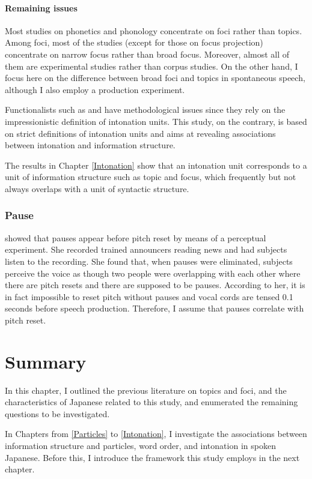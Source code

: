 \paragraph{Remaining issues}

Most studies on phonetics and phonology concentrate on
foci rather than topics.
Among foci, most of the studies (except for those on focus projection) concentrate on narrow focus rather than broad focus.
Moreover, almost all of them are experimental studies rather than
corpus studies.
On the other hand, I focus here on
the difference between broad foci and topics in spontaneous speech,
although I also employ a production experiment.

Functionalists such as  and 
have methodological issues since they rely on the impressionistic definition of intonation units.
This study, on the contrary, is based on
strict definitions of intonation units and
aims at revealing associations between intonation and information structure.

The results in Chapter \ref{Intonation} show that
an intonation unit corresponds to a unit of information structure such as topic and focus,
which frequently but not always overlaps with a unit of syntactic structure.

\subsubsection{Pause}

 showed that
pauses appear before pitch reset by means of a perceptual experiment.
She recorded trained announcers reading news and had subjects listen to the recording.
She found that, when pauses were eliminated,
subjects perceive the voice as though two people were overlapping with each other where there are pitch resets and there are supposed to be pauses.
According to her,
it is in fact impossible to reset pitch without pauses and
vocal cords are tensed 0.1 seconds before speech production.
Therefore, I assume that pauses correlate with pitch reset.

\section{Summary}

In this chapter,
I outlined the previous literature on topics and foci, and
the characteristics of Japanese related to this study,
and enumerated the remaining questions to be investigated.

In Chapters from \ref{Particles} to \ref{Intonation},
I investigate the associations between information structure and particles, word order, and intonation in spoken Japanese.
Before this,
I introduce the framework this study employs in the next chapter.




